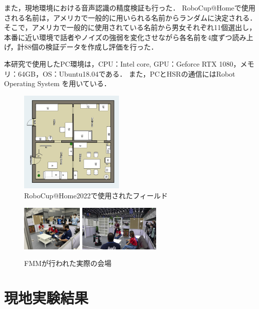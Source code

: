 \documentclass[a4j]{jarticle}
\begin{document}
また，現地環境における音声認識の精度検証も行った．
RoboCup@Homeで使用される名前は，アメリカで一般的に用いられる名前からランダムに決定される．
そこで，アメリカで一般的に使用されている名前から男女それぞれ11個選出し，
本番に近い環境で話者やノイズの強弱を変化させながら各名前を4度ずつ読み上げ，計88個の検証データを作成し評価を行った．

本研究で使用したPC環境は，CPU：Intel core, GPU：Geforce RTX 1080，メモリ：64GB，OS：Ubuntu18.04である．
また，PCとHSRの通信にはRobot Operating System \cite{ros_wiki}を用いている．
\begin{figure}[ht]
  \centering
  \includegraphics[width=5cm]{images/robocup/arenaBangkok_rotate.png}
  \caption{RoboCup@Home2022で使用されたフィールド}
  \label{robocup_field}
\end{figure}
\begin{figure}[ht]
  \centering
  \includegraphics[height=2.2cm]{images/robocup/FMM_onsite_overview_1.jpg}
  \includegraphics[height=2.2cm]{images/robocup/FMM_onsite_overview_3.jpg}
  \caption{FMMが行われた実際の会場}
  \label{onsite_overview_1}
\end{figure}


\section{現地実験結果}
\end{document}
